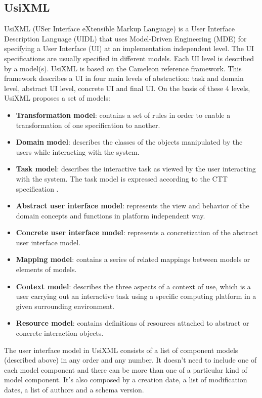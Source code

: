 \subsection{UsiXML}
\label{subsection:usixml}

UsiXML (USer Interface eXtensible Markup Language) is a User Interface Description Language (UIDL) that uses Model-Driven Engineering (MDE) for specifying a User Interface (UI) at an implementation independent level. The UI specifications are usually specified in different models. Each UI level is described by a model(s). UsiXML is based on the Cameleon reference framework\cite{Calvary}. This framework describes a UI in four main levels of abstraction: task and domain level, abstract UI level, concrete UI and final UI. On the basis of these 4 levels, UsiXML proposes a set of models:
\begin{itemize}
\item \textbf{Transformation model}: contains a set of rules in order to enable a transformation of one specification to another.
\item \textbf{Domain model}: describes the classes of the objects manipulated by the users while interacting with the system.
\item \textbf{Task model}: describes the interactive task as viewed by the user interacting with the system. The task model is expressed according to the CTT specification \cite{ConcurTaskTrees_A_Diagrammatic_Notation_for_Specifying_Task_Models}.
\item \textbf{Abstract user interface model}: represents the view and behavior of the domain concepts and functions in platform independent way.
\item \textbf{Concrete user interface model}: represents a concretization of the abstract user interface model.
\item \textbf{Mapping model}: contains a series of related mappings between models or elements of models.
\item \textbf{Context model}: describes the three aspects of a context of use, which is a user carrying out an interactive task using a specific computing platform in a given surrounding environment.
\item \textbf{Resource model}: contains definitions of resources attached to abstract or concrete interaction objects.
\end{itemize}

The user interface model in UsiXML consists of a list of component models (described above) in any order and any number. It doesn't need to include one of each model component and there can be more than one of a particular kind of model component. It's also composed by a creation date, a list of modification dates, a list of authors and a schema version.

